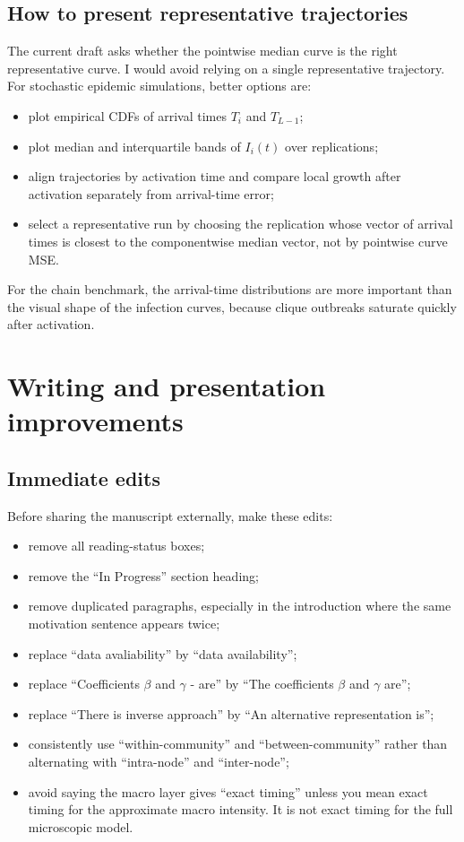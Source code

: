 \documentclass[12pt,a4paper]{article}
\theoremstyle{definition}
\newcommand{\1}{\mathbf{1}}
\begin{document}
\subsection{How to present representative trajectories}

The current draft asks whether the pointwise median curve is the right representative curve.  I would avoid relying on a single representative trajectory.  For stochastic epidemic simulations, better options are:
\begin{itemize}
    \item plot empirical CDFs of arrival times $T_i$ and $T_{L-1}$;
    \item plot median and interquartile bands of $I_i(t)$ over replications;
    \item align trajectories by activation time and compare local growth after activation separately from arrival-time error;
    \item select a representative run by choosing the replication whose vector of arrival times is closest to the componentwise median vector, not by pointwise curve MSE.
\end{itemize}

For the chain benchmark, the arrival-time distributions are more important than the visual shape of the infection curves, because clique outbreaks saturate quickly after activation.

\section{Writing and presentation improvements}

\subsection{Immediate edits}

Before sharing the manuscript externally, make these edits:
\begin{itemize}
    \item remove all reading-status boxes;
    \item remove the ``In Progress'' section heading;
    \item remove duplicated paragraphs, especially in the introduction where the same motivation sentence appears twice;
    \item replace ``data avaliability'' by ``data availability'';
    \item replace ``Coefficients $\beta$ and $\gamma$ - are'' by ``The coefficients $\beta$ and $\gamma$ are'';
    \item replace ``There is inverse approach'' by ``An alternative representation is'';
    \item consistently use ``within-community'' and ``between-community'' rather than alternating with ``intra-node'' and ``inter-node'';
    \item avoid saying the macro layer gives ``exact timing'' unless you mean exact timing for the approximate macro intensity.  It is not exact timing for the full microscopic model.
\end{itemize}
\end{document}
